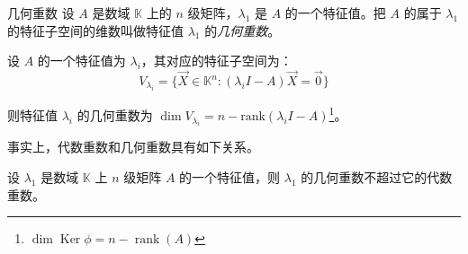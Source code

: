 \begin{definition}{几何重数}
	设 $A$ 是数域 $\mathbb K$ 上的 $n$ 级矩阵，$\lambda_1$ 是 $A$ 的一个特征值。把 $A$ 的属于 $\lambda_1$ 的特征子空间的维数叫做特征值 $\lambda_1$ 的\emph{几何重数}。
\end{definition}

设 $A$ 的一个特征值为 $\lambda_i$，其对应的特征子空间为：
$$
V_{\lambda_i} = \{\vec X \in \mathbb K^n \colon (\lambda_i I - A) \vec X = \vec 0\}
$$

则特征值 $\lambda_i$ 的几何重数为 $\dim V_{\lambda_i} = n - \mathrm{rank}(\lambda_i I -A)$\footnote{$\dim \operatorname{Ker} \phi = n - \operatorname{rank}(A)$}。

事实上，代数重数和几何重数具有如下关系。

\begin{theorem}
	设 $\lambda_1$ 是数域 $\mathbb K$ 上 $n$ 级矩阵 $A$ 的一个特征值，则 $\lambda_1$ 的几何重数不超过它的代数重数。
\end{theorem}


